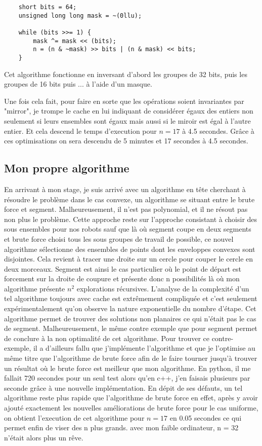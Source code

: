 \begin{verbatim}
	short bits = 64;
    unsigned long long mask = ~(0llu);

    while (bits >>= 1) {
        mask ^= mask << (bits);
        n = (n & ~mask) >> bits | (n & mask) << bits;
    }
\end{verbatim}

Cet algorithme fonctionne en inversant d'abord les groupes de 32 bits, puis les groupes de 16 bits puis ... à l'aide d'un masque.

Une fois cela fait, pour faire en sorte que les opérations soient invariantes par "mirror", je trompe le cache en lui indiquant de considérer égaux des entiers non seulement si leurs ensembles sont égaux mais aussi si le miroir est égal à l'autre entier. Et cela descend le temps d'execution pour $n = 17$ à 4.5 secondes.
Grâce à ces optimisations on sera descendu de 5 minutes et 17 secondes à 4.5 secondes.

\subsection{Mon propre algorithme}

En arrivant à mon stage, je suis arrivé avec un algorithme en tête cherchant à résoudre le problème dans le cas convexe, un algorithme se situant entre le brute force et segment. Malheureusement, il n'est pas polynomial, et il ne résout pas non plus le problème. Cette approche reste sur l'approche consistant à choisir des sous ensembles pour nos robots sauf que là où segment coupe en deux segments et brute force choisi tous les sous groupes de travail de possible, ce nouvel algorithme sélectionne des ensembles de points dont les enveloppes convexes sont disjointes. Cela revient à tracer une droite sur un cercle pour couper le cercle en deux morceaux. Segment est ainsi le cas particulier où le point de départ est forcement sur la droite de coupure et présente donc n possibilités là où mon algorithme présente $n^2$ explorations récursives. L'analyse de la complexité d'un tel algorithme toujours avec cache est extrêmement compliquée et c'est seulement expérimentalement qu'on observe la nature exponentielle du nombre d'étape. Cet algorithme permet de trouver des solutions non planaires ce qui n'était pas le cas de segment. Malheureusement, le même contre exemple que pour segment permet de conclure à la non optimalité de cet algorithme. Pour trouver ce contre-exemple, il a d'ailleurs fallu que j'implémente l'algorithme et que je l'optimise au même titre que l'algorithme de brute force afin de le faire tourner jusqu'à trouver un résultat où le brute force est meilleur que mon algorithme. En python, il me fallait 720 secondes pour un seul test alors qu'en c++, j'en faisais plusieurs par seconde grâce à une nouvelle implémentation.
En dépit de ses défauts, un tel algorithme reste plus rapide que l'algorithme de brute force en effet, après y avoir ajouté exactement les nouvelles améliorations de brute force pour le cas uniforme, on obtient l'execution de cet algorithme pour $n = 17$ en 0.05 secondes ce qui permet enfin de viser des n plus grands. avec mon faible ordinateur, n = 32 n'était alors plus un rêve.

